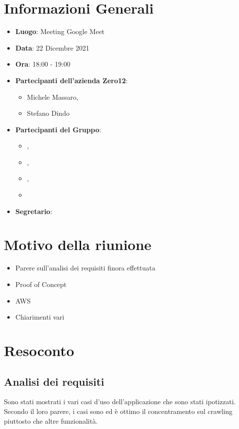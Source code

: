 \section{Informazioni Generali}

\begin{itemize}
\item{\textbf{Luogo}}: Meeting Google Meet
\item{\textbf{Data}}: 22 Dicembre 2021
\item{\textbf{Ora}}: 18:00 - 19:00
\item{\textbf{Partecipanti dell'azienda Zero12}}: 
	\begin{itemize}
	\item{Michele Massaro,} 
	\item{Stefano Dindo}
	\end{itemize} 
\item{\textbf{Partecipanti del Gruppo}}: 
	\begin{itemize}
	\item{\EP{},} 
	\item{\GC{},}
	\item{\MB{},}
	\item{\PV{}}
	\end{itemize} 
\item{\textbf{Segretario}}: \PV{}	
\end{itemize}

\section{Motivo della riunione}
\begin{itemize}
\item{Parere sull'analisi dei requisiti finora effettuata}
\item{Proof of Concept}
\item{AWS}
\item{Chiarimenti vari}
\end{itemize}

\section{Resoconto}

\subsection{Analisi dei requisiti}

Sono stati mostrati i vari casi d'uso dell'applicazione che sono stati ipotizzati. Secondo il loro parere, i casi sono  ed è ottimo il concentramento sul crawling piuttosto che altre  funzionalità.

